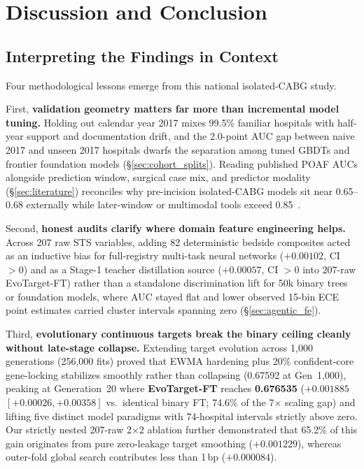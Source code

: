 \section{Discussion and Conclusion}
\label{sec:discussion}

\subsection{Interpreting the Findings in Context}
Four methodological lessons emerge from this national isolated-CABG study.

First, \textbf{validation geometry matters far more than incremental model tuning.} Holding out calendar year 2017 mixes 99.5\% familiar hospitals with half-year support and documentation drift, and the 2.0-point AUC gap between naive 2017 and unseen 2017 hospitals dwarfs the separation among tuned GBDTs and frontier foundation models (\S\ref{sec:cohort_splits}). Reading published POAF AUCs alongside prediction window, surgical case mix, and predictor modality (\S\ref{sec:literature}) reconciles why pre-incision isolated-CABG models sit near 0.65--0.68 externally while later-window or multimodal tools exceed 0.85~\cite{pollock2018sts,fields2025poaf,ma2025noaf,khalpey2026digital}.

Second, \textbf{honest audits clarify where domain feature engineering helps.} Across 207 raw STS variables, adding 82 deterministic bedside composites acted as an inductive bias for full-registry multi-task neural networks ($+0.00102$, CI $>0$) and as a Stage-1 teacher distillation source ($+0.00057$, CI $>0$ into 207-raw EvoTarget-FT) rather than a standalone discrimination lift for 50k binary trees or foundation models, where AUC stayed flat and lower observed 15-bin ECE point estimates carried cluster intervals spanning zero (\S\ref{sec:agentic_fe}).

Third, \textbf{evolutionary continuous targets break the binary ceiling cleanly without late-stage collapse.} Extending target evolution across 1,000 generations (256,000 fits) proved that EWMA hardening plus 20\% confident-core gene-locking stabilizes smoothly rather than collapsing (0.67592 at Gen~1,000), peaking at Generation~20 where \textbf{EvoTarget-FT} reaches \textbf{0.676535} ($+0.001885$ $[+0.00026, +0.00358]$ vs.\ identical binary FT; 74.6\% of the 7$\times$ scaling gap) and lifting five distinct model paradigms with 74-hospital intervals strictly above zero. Our strictly nested 207-raw 2$\times$2 ablation further demonstrated that 65.2\% of this gain originates from pure zero-leakage target smoothing ($+0.001229$), whereas outer-fold global search contributes less than 1\,bp ($+0.000084$).

